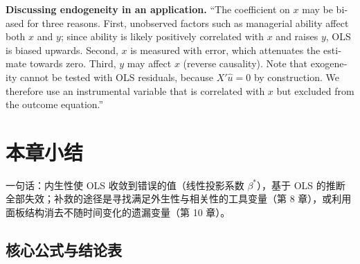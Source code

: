 \begin{english}
\textbf{Discussing endogeneity in an application.} ``The coefficient on $x$ may be biased for three reasons. First, unobserved factors such as managerial ability affect both $x$ and $y$; since ability is likely positively correlated with $x$ and raises $y$, OLS is biased upwards. Second, $x$ is measured with error, which attenuates the estimate towards zero. Third, $y$ may affect $x$ (reverse causality). Note that exogeneity cannot be tested with OLS residuals, because $X'\hat u=0$ by construction. We therefore use an instrumental variable that is correlated with $x$ but excluded from the outcome equation.''
\end{english}

\section{本章小结}\label{sec:U07-summary}

一句话：内生性使 OLS 收敛到错误的值（线性投影系数 $\beta^*$），基于 OLS 的推断全部失效；补救的途径是寻找满足外生性与相关性的工具变量（第 8 章），或利用面板结构消去不随时间变化的遗漏变量（第 10 章）。

\subsection{核心公式与结论表}

